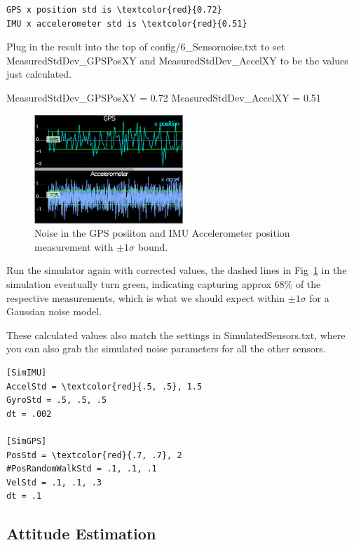 \documentclass[letterpaper]{article}
\begin{document}
\begin{Verbatim}[frame=lines, label=Calculation Result Output, commandchars=\\\{\}]
GPS x position std is \textcolor{red}{0.72}
IMU x accelerometer std is \textcolor{red}{0.51}
\end{Verbatim}

Plug in the result into the top of config/6\_Sensornoise.txt to set MeasuredStdDev\_GPSPosXY and MeasuredStdDev\_AccelXY to be the values just calculated.

\begin{Python}
MeasuredStdDev_GPSPosXY = 0.72
MeasuredStdDev_AccelXY = 0.51
\end{Python}

\begin{figure}[ht]
\centering
\includegraphics[width=0.5\textwidth]{./images/noise2.png}
\caption{\label{fig:noise2} Noise in the GPS posiiton and IMU Accelerometer position measurement with $\pm 1 \sigma$ bound.}
\end{figure}

Run the simulator again with corrected values, the dashed lines in Fig~\ref{fig:noise2} in the simulation eventually turn green, indicating capturing approx 68\% of the respective measurements, which is what we should expect within $\pm 1 \sigma$ for a Gaussian noise model.

These calculated values also match the settings in SimulatedSensors.txt, where you can also grab the simulated noise parameters for all the other sensors.

\begin{Verbatim}[frame=single, commandchars=\\\{\}]
[SimIMU]
AccelStd = \textcolor{red}{.5, .5}, 1.5
GyroStd = .5, .5, .5
dt = .002

[SimGPS]
PosStd = \textcolor{red}{.7, .7}, 2
#PosRandomWalkStd = .1, .1, .1
VelStd = .1, .1, .3
dt = .1
\end{Verbatim}

\subsection{Attitude Estimation}
\end{document}
